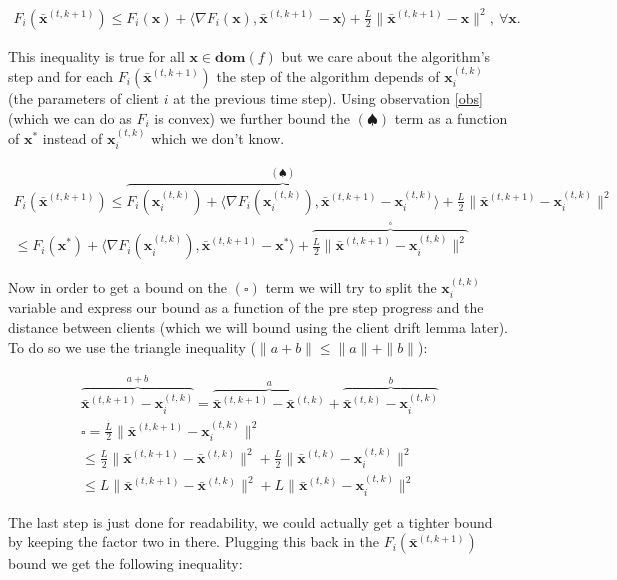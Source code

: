 \begin{align*}
    F_i(\bar{\bm{x}}^{(t,k+1)}) \leq  F_i(\bm{x}) +  \langle \nabla F_i(\bm{x}) ,\bar{\bm{x}}^{(t,k+1)}-\bm{x} \rangle +  \frac{L}{2} \|\bar{\bm{x}}^{(t,k+1)}-\bm{x} \|^2, ~ \forall \bm{x}.
\end{align*}

This inequality is true for all $\bm{x} \in \bm{dom}(f)$ but we care about the algorithm's step and for each $F_i(\bar{\bm{x}}^{(t,k+1)})$ the step of the algorithm depends of $\bm{x}_i^{(t,k)}$ (the parameters of client $i$ at the previous time step). Using observation \ref{obs} (which we can do as $F_i$ is convex) we further bound the $(\spadesuit)$ term as a function of $\bm{x}^*$ instead of $\bm{x}_i^{(t,k)}$ which we don't know.

\begin{align*}
    F_i(\bar{\bm{x}}^{(t,k+1)}) \leq \overbrace{F_i(\bm{x}_i^{(t,k)}) +  \langle \nabla F_i(\bm{x}_i^{(t,k)}) ,\bar{\bm{x}}^{(t,k+1)}-\bm{x}_i^{(t,k)} \rangle}^{(\spadesuit)} +  \frac{L}{2} \|\bar{\bm{x}}^{(t,k+1)}-\bm{x}_i^{(t,k)} \|^2 \\
    \leq F_i(\bm{x}^{*}) +  \langle \nabla F_i(\bm{x}_i^{(t,k)}) ,\bar{\bm{x}}^{(t,k+1)} - \bm{x}^{*} \rangle + \overbrace{ \frac{L}{2} \|\bar{\bm{x}}^{(t,k+1)}-\bm{x}_i^{(t,k)} \|^2}^{\square}
\end{align*}

Now in order to get a bound on the $(\square)$ term we will try to split the $\bm{x}_i^{(t,k)}$ variable and express our bound as a function of the  pre step progress and the distance between clients (which we will bound using the client drift lemma later). To do so we use the triangle inequality ($\|a+b\| \leq \|a\|+\|b\|$):


\begin{align*}
    \overbrace{\bar{\bm{x}}^{(t,k+1)}-\bm{x}_i^{(t,k)}}^{a+b} = \overbrace{\bar{\bm{x}}^{(t,k+1)} - \bar{\bm{x}}^{(t,k)}}^a + \overbrace{\bar{\bm{x}}^{(t,k)} - \bm{x}_i^{(t,k)} }^b\\
    \square = \frac{L}{2} \|\bar{\bm{x}}^{(t,k+1)}-\bm{x}_i^{(t,k)} \|^2 \\
    \leq  \frac{L}{2} \|\bar{\bm{x}}^{(t,k+1)}-\bar{\bm{x}}^{(t,k)} \|^2  + \frac{L}{2} \|\bar{\bm{x}}^{(t,k)}-\bm{x}_i^{(t,k)} \|^2  \\
    \leq  L \|\bar{\bm{x}}^{(t,k+1)}-\bar{\bm{x}}^{(t,k)} \|^2  + L \|\bar{\bm{x}}^{(t,k)}-\bm{x}_i^{(t,k)} \|^2 
\end{align*}

The last step is just done for readability, we could actually get a tighter bound by keeping the factor two in there. Plugging this back in the $F_i(\bar{\bm{x}}^{(t,k+1)})$ bound we get the following inequality:



